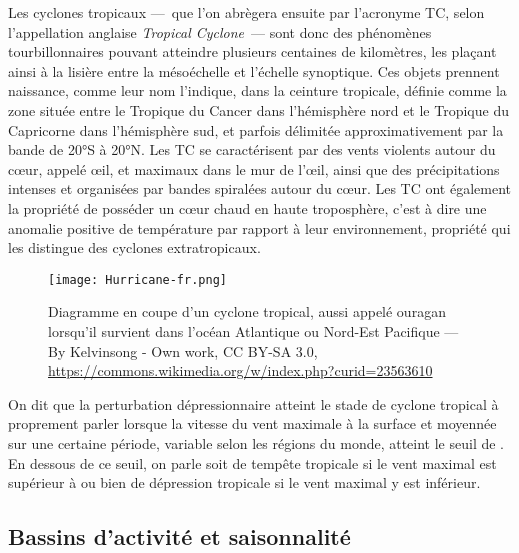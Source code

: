 \documentclass[../main.tex]{subfiles}
\begin{document}
Les cyclones tropicaux ---~que l'on abrègera ensuite par l'acronyme TC, selon l'appellation anglaise \textit{Tropical Cyclone}~--- sont donc des phénomènes
tourbillonnaires pouvant atteindre plusieurs centaines de kilomètres, les plaçant ainsi à la lisière entre la mésoéchelle et l'échelle synoptique. Ces objets
prennent naissance, comme leur nom l'indique, dans la ceinture tropicale, définie comme la zone située entre le Tropique du Cancer dans l'hémisphère nord et le
Tropique du Capricorne dans l'hémisphère sud, et parfois délimitée approximativement par la bande de \ang{20}S à \ang{20}N. Les TC se caractérisent par des
vents violents autour du cœur, appelé œil, et maximaux dans le mur de l'œil, ainsi que des précipitations intenses et organisées par bandes spiralées autour du
cœur. Les TC ont également la propriété de posséder un cœur chaud en haute troposphère, c'est à dire une anomalie positive de température par rapport à leur environnement,
propriété qui les distingue des cyclones extratropicaux.
%
\begin{figure}[tb]
    \centering
    \texttt{[image: Hurricane-fr.png]}
    \caption{Diagramme en coupe d'un cyclone tropical, aussi appelé ouragan lorsqu'il survient dans l'océan Atlantique ou Nord-Est Pacifique --- By Kelvinsong -
    Own work, CC BY-SA 3.0, \url{https://commons.wikimedia.org/w/index.php?curid=23563610}}
    \label{fig:diagramme_TC}
\end{figure}
%
On dit que la perturbation dépressionnaire atteint le stade de cyclone tropical à proprement parler lorsque la vitesse du vent maximale à la surface et moyennée
sur une certaine période, variable selon les régions du monde, atteint le seuil de . En dessous de ce seuil, on parle soit de tempête tropicale si le
vent maximal est supérieur à  ou bien de dépression tropicale si le vent maximal y est inférieur.

\subsection{Bassins d'activité et saisonnalité}\label{sec:bassins_saisons}
\end{document}
